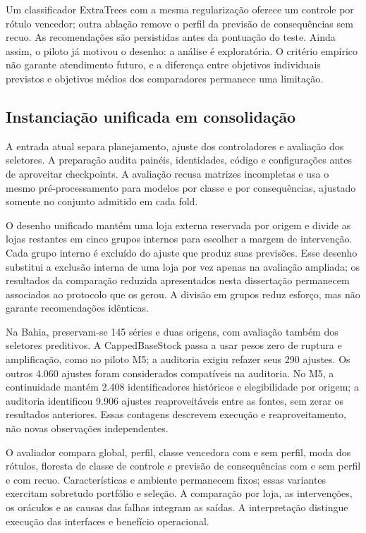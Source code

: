 Um classificador ExtraTrees com a mesma regularização oferece um controle por rótulo vencedor; outra ablação remove o perfil da previsão de consequências sem recuo. As recomendações são persistidas antes da pontuação do teste. Ainda assim, o piloto já motivou o desenho: a análise é exploratória. O critério empírico não garante atendimento futuro, e a diferença entre objetivos individuais previstos e objetivos médios dos comparadores permanece uma limitação.

\subsection{Instanciação unificada em consolidação}
A entrada atual separa planejamento, ajuste dos controladores e avaliação dos seletores. A preparação audita painéis, identidades, código e configurações antes de aproveitar checkpoints. A avaliação recusa matrizes incompletas e usa o mesmo pré-processamento para modelos por classe e por consequências, ajustado somente no conjunto admitido em cada fold.

O desenho unificado mantém uma loja externa reservada por origem e divide as lojas restantes em cinco grupos internos para escolher a margem de intervenção. Cada grupo interno é excluído do ajuste que produz suas previsões. Esse desenho substitui a exclusão interna de uma loja por vez apenas na avaliação ampliada; os resultados da comparação reduzida apresentados nesta dissertação permanecem associados ao protocolo que os gerou. A divisão em grupos reduz esforço, mas não garante recomendações idênticas.

Na Bahia, preservam-se 145 séries e duas origens, com avaliação também dos seletores preditivos. A CappedBaseStock passa a usar pesos zero de ruptura e amplificação, como no piloto M5; a auditoria exigiu refazer seus 290 ajustes. Os outros 4.060 ajustes foram considerados compatíveis na auditoria. No M5, a continuidade mantém 2.408 identificadores históricos e elegibilidade por origem; a auditoria identificou 9.906 ajustes reaproveitáveis entre as fontes, sem zerar os resultados anteriores. Essas contagens descrevem execução e reaproveitamento, não novas observações independentes.

O avaliador compara global, perfil, classe vencedora com e sem perfil, moda dos rótulos, floresta de classe de controle e previsão de consequências com e sem perfil e com recuo. Características e ambiente permanecem fixos; essas variantes exercitam sobretudo portfólio e seleção. A comparação por loja, as intervenções, os oráculos e as causas das falhas integram as saídas. A interpretação distingue execução das interfaces e benefício operacional.

